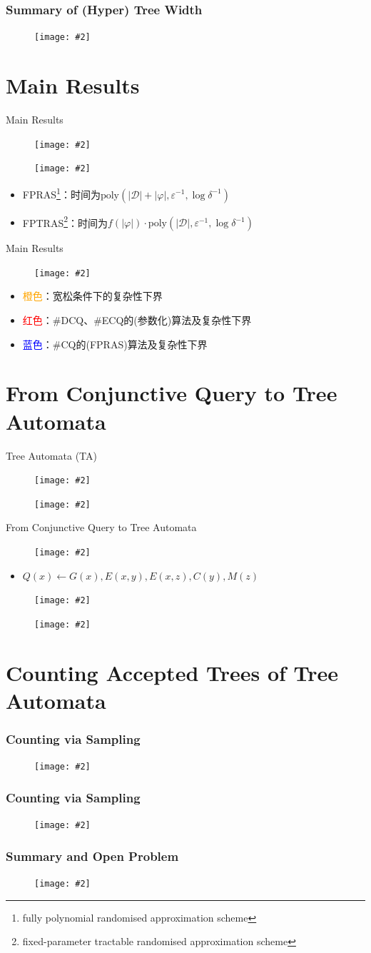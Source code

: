 \documentclass{beamer}
\newcommand{\pic}[2][100]{
	\begin{figure}
		\centering
		\texttt{[image: \#2]}
	\end{figure}
}
\newcommand{\picframe}[3][100]{
	\begin{frame}
		\frametitle{#2}
		\pic[#1]{#3}
	\end{frame}
}
\begin{document}
	\picframe{Summary of (Hyper) Tree Width}{pics/tw}
	\section{Main Results}
	\begin{frame}{Main Results}
		\pic{pics/mainthm}
		\pic{pics/proofapproach}
		\begin{itemize}
			\item FPRAS\footnote{fully polynomial randomised approximation scheme}：时间为$\mathrm{poly}(|\mathcal{D}|+|\varphi|,\varepsilon^{-1},\log\delta^{-1})$
			\item FPTRAS\footnote{fixed-parameter tractable randomised approximation scheme}：时间为$f(|\varphi|)\cdot\mathrm{poly}(|\mathcal{D}|,\varepsilon^{-1},\log\delta^{-1})$
		\end{itemize}
	\end{frame}
	\begin{frame}{Main Results}
		\pic{pics/results}
		\vspace{-1ex}
		\begin{itemize}
			\item \textcolor{orange}{橙色}：宽松条件下的复杂性下界
			\item \textcolor{red}{红色}：\#DCQ、\#ECQ的{\tiny(参数化)}算法及复杂性下界
			\item \textcolor{blue}{蓝色}：\#CQ的{\tiny(FPRAS)}算法及复杂性下界 
		\end{itemize}
	\end{frame}
	\section{From Conjunctive Query to Tree Automata}
	\begin{frame}{Tree Automata (TA)}
		\pic{pics/treeautomata}
		\pic{pics/taexample}			
	\end{frame}
	\begin{frame}{From Conjunctive Query to Tree Automata}
		\pic{pics/cq2ta}
		\begin{itemize}
			\item $Q(x)\leftarrow G(x), E(x, y), E(x, z), C(y), M(z)$
		\end{itemize}
		\pic{pics/anstree}
		\pic{pics/cta}	
	\end{frame}
	\section{Counting Accepted Trees of Tree Automata}
	\begin{frame}
		\frametitle{Counting via Sampling}
		\pic{pics/dp}
	\end{frame}
	\picframe{Counting via Sampling}{pics/sample}
	\picframe{Summary and Open Problem}{pics/cfg}
\end{document}
